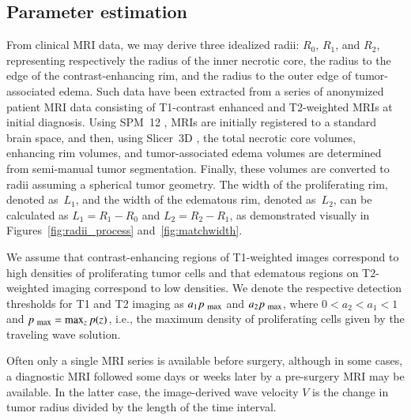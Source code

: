 \documentclass{aims}
\numberwithin{equation}{section}
\begin{document}
\subsection{Parameter estimation}
\label{paramest-sec}

From clinical MRI data, we may derive three idealized radii:
$R_{0}$, $R_{1}$, and $R_{2}$, representing respectively the radius of the
inner necrotic core, the radius to the edge of the contrast-enhancing rim,
and the radius to the outer edge of tumor-associated edema.  Such data have
been extracted from a series of anonymized patient MRI data consisting of
T1-contrast enhanced and T2-weighted MRIs at initial diagnosis.  Using
SPM~12 \cite{Penny2007}, MRIs are initially registered to a standard brain
space, and then, using Slicer~3D \cite{Fedorov2012}, the total necrotic core
volumes, enhancing rim volumes, and tumor-associated edema volumes are
determined from semi-manual tumor segmentation.  Finally, these volumes are
converted to radii assuming a spherical tumor geometry.  The width of the
proliferating rim, denoted as~$L_{1}$, and the width of the edematous rim,
denoted as~$L_{2}$, can be calculated as $L_{1}=R_{1}-R_{0}$ and
$L_{2}=R_{2}-R_{1}$, as demonstrated visually in
Figures~\ref{fig:radii_process} and~\ref{fig:matchwidth}.

We assume that contrast-enhancing regions of T1-weighted images
correspond to high densities of proliferating tumor cells and that edematous
regions on T2-weighted imaging correspond to low densities.  We denote the
respective detection thresholds for T1 and T2 imaging as
$a_1p_{\mbox{\scriptsize max}}$ and $a_2 p_{\mbox{\scriptsize max}}$,
where $0 < a_2 < a_1 < 1$ and 
$p_{\mbox{\scriptsize max}}=\max_{z} p(z)$,
i.e., the maximum density of proliferating cells given by the traveling wave
solution.

Often only a single MRI series is available before surgery, although in some
cases, a diagnostic MRI followed some days or weeks later by a pre-surgery MRI
may be available.  In the latter case, the
image-derived wave velocity $V$ is the change in tumor radius divided
by the length of the time interval.
\end{document}
